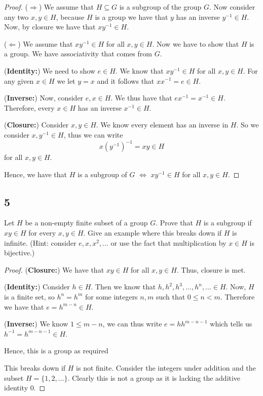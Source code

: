 \documentclass{article}
\begin{document}
\begin{proof}
    ($\Rightarrow$) We assume that $H \subseteq G$ is a subgroup of the group $G$.
    Now consider any two $x, y \in H$, because $H$ is a group we have that $y$ has
    an inverse $y^{-1} \in H$. Now, by closure we have that $xy^{-1} \in H$.

    ($\Leftarrow$) We assume that $xy^{-1} \in H$ for all $x,y \in H$. Now we
    have to show that $H$ is a group. We have associativity that comes from $G$.

    (\textbf{Identity:}) We need to show $e\in H$. We know that
    $xy^{-1} \in H$ for all $x,y \in H$. For any given $x \in H$
    we let $y = x$ and it follows that $xx^{-1} = e \in H$.

    (\textbf{Inverse:}) Now, consider $e, x \in H$. We thus have that
    $ex^{-1} = x^{-1} \in H$. Therefore, every $x \in H$ has an inverse
    $x^{-1} \in H$.

    (\textbf{Closure:}) Consider $x,y \in H$. We know every element has an
    inverse in $H$. So we consider $x, y^{-1} \in H$, thus we can write
    \begin{equation*}
        x(y^{-1})^{-1} = xy \in H
    \end{equation*}
    for all $x, y \in H$.

    Hence, we have that $H$ is a subgroup of $G$ $\iff$ $xy^{-1} \in H$
    for all $x,y\in H$.

\end{proof}

\subsection*{5}
Let $H$ be a non-empty finite subset of a group $G$. Prove that $H$ is a subgroup
if $xy \in H$ for every $x,y \in H$. Give an example where this breaks down
if $H$ is infinite. (Hint: consider $e,x, x^2,\dots$ or use the fact that
multiplication by $x \in H$ is bijective.)

\begin{proof}
    (\textbf{Closure:}) We have that $xy \in H$ for all $x,y\in H$. Thus, closure
    is met.

    (\textbf{Identity:}) Consider $h \in H$. Then we know that
    $h, h^2, h^3, \dots,h^n,... \in H$. Now, $H$ is a finite set, so
    $h^n = h^m$ for some integers $n,m$ such that $0 \leq n < m$.
    Therefore we have that $e = h^{m-n} \in H$.

    (\textbf{Inverse:}) We know $1 \leq m - n$, we can thus write
    $e = hh^{m - n - 1}$ which tells us $h^{-1} = h^{m - n - 1} \in H$.

    Hence, this is a group as required

    This breaks down if $H$ is not finite. Consider the integers under addition
    and the subset $H = \{1,2,\dots\}$. Clearly this is not a group as it is
    lacking the additive identity 0.
\end{proof}
\end{document}
